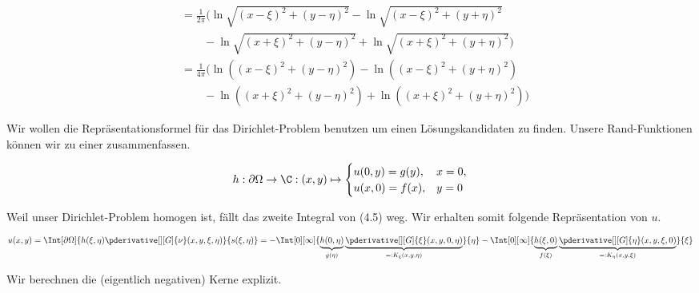 \begin{solution}
\begin{align*}
{{    }
  } \\
  & =
  \frac{1}{2 \pi}
  \Big (
    \ln \sqrt{(x - \xi)^2 + (y - \eta)^2}
    -
    \ln \sqrt{(x - \xi)^2 + (y + \eta)^2} \\
    & \qquad -
    \ln \sqrt{(x + \xi)^2 + (y - \eta)^2}
    +
    \ln \sqrt{(x + \xi)^2 + (y + \eta)^2}
  \Big ) \\
  & =
  \frac{1}{4 \pi}
  \Big (
    \ln ((x - \xi)^2 + (y - \eta)^2)
    -
    \ln ((x - \xi)^2 + (y + \eta)^2) \\
    & \qquad -
    \ln ((x + \xi)^2 + (y - \eta)^2)
    +
    \ln ((x + \xi)^2 + (y + \eta)^2)
    \Big )
  \end{align*}


  Wir wollen die Repräsentationsformel für das Dirichlet-Problem benutzen um einen Lösungskandidaten zu finden.
  Unsere Rand-Funktionen können wir zu einer zusammenfassen.

  \begin{align*}
    h:
    \partial \Omega \to \C:
    (x, y)
    \mapsto
    \begin{cases}
      u(0, y) = g(y), & x = 0, \\
      u(x, 0) = f(x), & y = 0
    \end{cases}
  \end{align*}

  Weil unser Dirichlet-Problem homogen ist, fällt das zweite Integral von (4.5) weg.
  Wir erhalten somit folgende Repräsentation von $u$.

  \begin{align*}
    u(x, y)
    =
    \Int[\partial \Omega]
    {
      h(\xi, \eta)
      \pderivative[][G]{\nu}
      (x, y, \xi, \eta)
    }{
      s(\xi, \eta)
    }
    =
    -\Int[0][\infty]
    {
      \underbrace{h(0, \eta)}_{g(\eta)}
      \underbrace
      {
        \pderivative[][G]{\xi}
        (x, y, 0, \eta)
      }_{
        =: K_\xi(x, y, \eta)
      }
    }{\eta}
    -\Int[0][\infty]
    {
      \underbrace{h(\xi, 0)}_{f(\xi)}
      \underbrace
      {
        \pderivative[][G]{\eta}
        (x, y, \xi, 0)
      }_{
        =: K_\eta(x, y, \xi)
      }
    }{\xi}
  \end{align*}

  Wir berechnen die (eigentlich negativen) Kerne explizit.


\end{solution}
